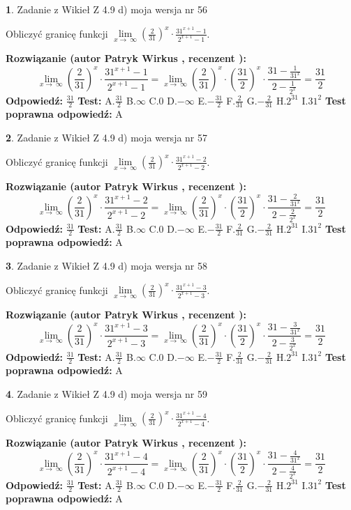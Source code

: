 \documentclass[12pt, a4paper]{article}
\theoremstyle{definition} %
\newtheorem{zad}{}
\newcommand{\zadStart}[1]{\begin{zad}#1\newline}
\newcommand{\zadStop}{\end{zad}}
\newcommand{\rozwStart}[2]{\noindent \textbf{Rozwiązanie (autor #1 , recenzent #2): }\newline}
\newcommand{\rozwStop}{\newline}
\newcommand{\odpStart}{\noindent \textbf{Odpowiedź:}\newline}
\newcommand{\odpStop}{\newline}
\newcommand{\testStart}{\noindent \textbf{Test:}\newline}
\newcommand{\testStop}{\newline}
\newcommand{\kluczStart}{\noindent \textbf{Test poprawna odpowiedź:}\newline}
\newcommand{\kluczStop}{\newline}
\begin{document}
\zadStart{Zadanie z Wikieł Z 4.9 d) moja wersja nr 56}


Obliczyć granicę funkcji  $\lim\limits_{x\to\ \infty}(\frac{2}{31})^{x}\cdot\frac{31^{x+1}-1}{2^{x+1}-1}$.
\zadStop
\rozwStart{Patryk Wirkus}{}
$$\lim\limits_{x\to\ \infty}(\frac{2}{31})^{x}\cdot\frac{31^{x+1}-1}{2^{x+1}-1}=\lim\limits_{x\to\ \infty}(\frac{2}{31})^{x}\cdot(\frac{31}{2})^{x} \cdot \frac{31-\frac{1}{31^{x}}}{2-\frac{1}{2^{x}}} = \frac{31}{2}$$
\rozwStop
\odpStart
$\frac{31}{2}$
\odpStop
\testStart
A.$\frac{31}{2}$ B.$\infty$ C.$0$ D.$-\infty$ E.$-\frac{31}{2}$
F.$\frac{2}{31}$ G.$-\frac{2}{31}$
H.$2^{31}$
I.$31^{2}$
\testStop
\kluczStart
A
\kluczStop



\zadStart{Zadanie z Wikieł Z 4.9 d) moja wersja nr 57}


Obliczyć granicę funkcji  $\lim\limits_{x\to\ \infty}(\frac{2}{31})^{x}\cdot\frac{31^{x+1}-2}{2^{x+1}-2}$.
\zadStop
\rozwStart{Patryk Wirkus}{}
$$\lim\limits_{x\to\ \infty}(\frac{2}{31})^{x}\cdot\frac{31^{x+1}-2}{2^{x+1}-2}=\lim\limits_{x\to\ \infty}(\frac{2}{31})^{x}\cdot(\frac{31}{2})^{x} \cdot \frac{31-\frac{2}{31^{x}}}{2-\frac{2}{2^{x}}} = \frac{31}{2}$$
\rozwStop
\odpStart
$\frac{31}{2}$
\odpStop
\testStart
A.$\frac{31}{2}$ B.$\infty$ C.$0$ D.$-\infty$ E.$-\frac{31}{2}$
F.$\frac{2}{31}$ G.$-\frac{2}{31}$
H.$2^{31}$
I.$31^{2}$
\testStop
\kluczStart
A
\kluczStop



\zadStart{Zadanie z Wikieł Z 4.9 d) moja wersja nr 58}


Obliczyć granicę funkcji  $\lim\limits_{x\to\ \infty}(\frac{2}{31})^{x}\cdot\frac{31^{x+1}-3}{2^{x+1}-3}$.
\zadStop
\rozwStart{Patryk Wirkus}{}
$$\lim\limits_{x\to\ \infty}(\frac{2}{31})^{x}\cdot\frac{31^{x+1}-3}{2^{x+1}-3}=\lim\limits_{x\to\ \infty}(\frac{2}{31})^{x}\cdot(\frac{31}{2})^{x} \cdot \frac{31-\frac{3}{31^{x}}}{2-\frac{3}{2^{x}}} = \frac{31}{2}$$
\rozwStop
\odpStart
$\frac{31}{2}$
\odpStop
\testStart
A.$\frac{31}{2}$ B.$\infty$ C.$0$ D.$-\infty$ E.$-\frac{31}{2}$
F.$\frac{2}{31}$ G.$-\frac{2}{31}$
H.$2^{31}$
I.$31^{2}$
\testStop
\kluczStart
A
\kluczStop



\zadStart{Zadanie z Wikieł Z 4.9 d) moja wersja nr 59}


Obliczyć granicę funkcji  $\lim\limits_{x\to\ \infty}(\frac{2}{31})^{x}\cdot\frac{31^{x+1}-4}{2^{x+1}-4}$.
\zadStop
\rozwStart{Patryk Wirkus}{}
$$\lim\limits_{x\to\ \infty}(\frac{2}{31})^{x}\cdot\frac{31^{x+1}-4}{2^{x+1}-4}=\lim\limits_{x\to\ \infty}(\frac{2}{31})^{x}\cdot(\frac{31}{2})^{x} \cdot \frac{31-\frac{4}{31^{x}}}{2-\frac{4}{2^{x}}} = \frac{31}{2}$$
\rozwStop
\odpStart
$\frac{31}{2}$
\odpStop
\testStart
A.$\frac{31}{2}$ B.$\infty$ C.$0$ D.$-\infty$ E.$-\frac{31}{2}$
F.$\frac{2}{31}$ G.$-\frac{2}{31}$
H.$2^{31}$
I.$31^{2}$
\testStop
\kluczStart
A
\kluczStop
\end{document}
